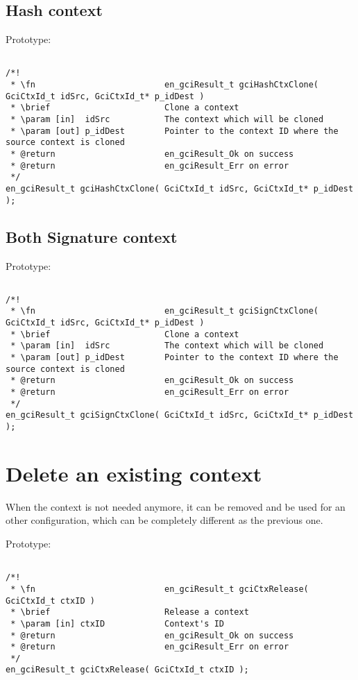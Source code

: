 \subsection{Hash context}
Prototype:
\begin{lstlisting}

/*!
 * \fn 							en_gciResult_t gciHashCtxClone( GciCtxId_t idSrc, GciCtxId_t* p_idDest )
 * \brief						Clone a context
 * \param [in]  idSrc			The context which will be cloned
 * \param [out] p_idDest		Pointer to the context ID where the source context is cloned
 * @return						en_gciResult_Ok on success
 * @return						en_gciResult_Err on error
 */
en_gciResult_t gciHashCtxClone( GciCtxId_t idSrc, GciCtxId_t* p_idDest );

\end{lstlisting}

\subsection{Both Signature context}
Prototype:
\begin{lstlisting}

/*!
 * \fn 							en_gciResult_t gciSignCtxClone( GciCtxId_t idSrc, GciCtxId_t* p_idDest )
 * \brief						Clone a context
 * \param [in]  idSrc			The context which will be cloned
 * \param [out] p_idDest		Pointer to the context ID where the source context is cloned
 * @return						en_gciResult_Ok on success
 * @return						en_gciResult_Err on error
 */
en_gciResult_t gciSignCtxClone( GciCtxId_t idSrc, GciCtxId_t* p_idDest );

\end{lstlisting}

\newpage

\section{Delete an existing context}
\label{delCtx}

When the context is not needed anymore, it can be removed and be used for an
other configuration, which can be completely different as the previous one.

Prototype:
\begin{lstlisting}

/*!
 * \fn 							en_gciResult_t gciCtxRelease( GciCtxId_t ctxID )
 * \brief						Release a context
 * \param [in] ctxID			Context's ID
 * @return						en_gciResult_Ok on success
 * @return						en_gciResult_Err on error
 */
en_gciResult_t gciCtxRelease( GciCtxId_t ctxID );

\end{lstlisting}
